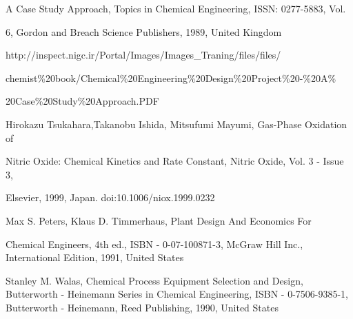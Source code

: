 \documentclass[a4paper,portrait,12pt]{article}
\begin{document}
\begin{flushleft}
A Case Study Approach, Topics in Chemical Engineering, ISSN: 0277-5883, Vol.
\end{flushleft}


\begin{flushleft}
6, Gordon and Breach Science Publishers, 1989, United Kingdom
\end{flushleft}


\begin{flushleft}
http://inspect.nigc.ir/Portal/Images/Images\_Traning/files/files/
\end{flushleft}


\begin{flushleft}
chemist\%20book/Chemical\%20Engineering\%20Design\%20Project\%20-\%20A\%
\end{flushleft}


\begin{flushleft}
20Case\%20Study\%20Approach.PDF
\end{flushleft}


\begin{flushleft}
[9] Hirokazu Tsukahara,Takanobu Ishida, Mitsufumi Mayumi, Gas-Phase Oxidation of
\end{flushleft}


\begin{flushleft}
Nitric Oxide: Chemical Kinetics and Rate Constant, Nitric Oxide, Vol. 3 - Issue 3,
\end{flushleft}


\begin{flushleft}
Elsevier, 1999, Japan. doi:10.1006/niox.1999.0232
\end{flushleft}


\begin{flushleft}
[10] Max S. Peters, Klaus D. Timmerhaus, Plant Design And Economics For
\end{flushleft}


\begin{flushleft}
Chemical Engineers, 4th ed., ISBN - 0-07-100871-3, McGraw Hill Inc., International Edition, 1991, United States
\end{flushleft}


\begin{flushleft}
[11] Stanley M. Walas, Chemical Process Equipment Selection and Design, Butterworth - Heinemann Series in Chemical Engineering, ISBN - 0-7506-9385-1, Butterworth - Heinemann, Reed Publishing, 1990, United States
\end{flushleft}
\end{document}
